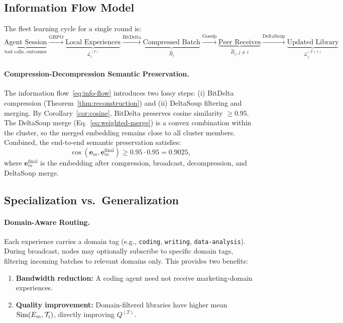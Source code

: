 \subsection{Information Flow Model}

The fleet learning cycle for a single round is:
\begin{equation}
    \underbrace{\text{Agent Session}}_{\text{tool calls, outcomes}}
    \xrightarrow{\text{GRPO}}
    \underbrace{\text{Local Experiences}}_{\mathcal{L}_i^{(T)}}
    \xrightarrow{\text{BitDelta}}
    \underbrace{\text{Compressed Batch}}_{\hat{B}_i}
    \xrightarrow{\text{Gossip}}
    \underbrace{\text{Peer Receives}}_{\hat{B}_j, j \neq i}
    \xrightarrow{\text{DeltaSoup}}
    \underbrace{\text{Updated Library}}_{\mathcal{L}_j^{(T+1)}}
    \label{eq:info-flow}
\end{equation}

\paragraph{Compression-Decompression Semantic Preservation.}
The information flow~\eqref{eq:info-flow} introduces two lossy steps:
(i) BitDelta compression (Theorem~\ref{thm:reconstruction}) and
(ii) DeltaSoup filtering and merging. By Corollary~\ref{cor:cosine},
BitDelta preserves cosine similarity $\geq 0.95$. The DeltaSoup merge
(Eq.~\ref{eq:weighted-merge}) is a convex combination within the cluster,
so the merged embedding remains close to all cluster members. Combined,
the end-to-end semantic preservation satisfies:
\begin{equation}
    \cos(\bm{e}_m, \bm{e}_m^{\text{final}}) \geq 0.95 \cdot 0.95 = 0.9025,
    \label{eq:end-to-end-cosine}
\end{equation}
where $\bm{e}_m^{\text{final}}$ is the embedding after compression,
broadcast, decompression, and DeltaSoup merge.

\subsection{Specialization vs.\ Generalization}

\paragraph{Domain-Aware Routing.}
Each experience carries a domain tag (e.g., \texttt{coding}, \texttt{writing},
\texttt{data-analysis}). During broadcast, nodes may optionally subscribe to
specific domain tags, filtering incoming batches to relevant domains only.
This provides two benefits:
\begin{enumerate}[leftmargin=1.5em]
    \item \textbf{Bandwidth reduction:} A coding agent need not receive
          marketing-domain experiences.
    \item \textbf{Quality improvement:} Domain-filtered libraries have higher
          mean $\operatorname{Sim}(E_m, \mathcal{T}_i)$, directly improving $Q^{(T)}$.
\end{enumerate}


